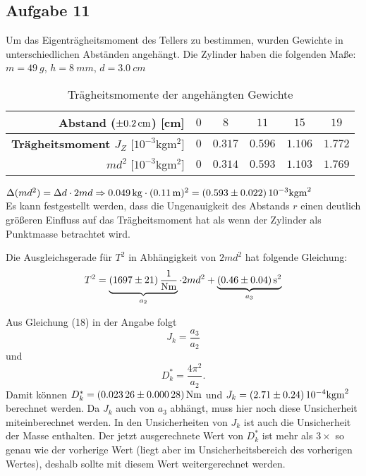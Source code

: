 \documentclass[a4paper,11pt,ngerman]{scrartcl}
\begin{document}
\subsection{Aufgabe 11}
Um das Eigenträgheitsmoment des Tellers zu bestimmen, wurden Gewichte in unterschiedlichen Abständen angehängt.
Die Zylinder haben die folgenden Maße: $m = \SI{49}{g}$, $h = \SI{8}{mm}$, $d = \SI{3.0}{cm}$
\begin{table}[ht]
\begin{center}\label{tab:Gewichte}
\begin{tabular}{r|ccccc}\hline
\textbf{Abstand} ($\SI{\pm 0.2}{cm}$) [cm] & $0$ & $8$ & $11$ & $15$ & $19$ \\
\hline
\textbf{Trägheitsmoment $J_Z$} [$10^{-3}$kgm$^2$] & $0$ & $0.317$ & $0.596$ & $1.106$ & $1.772$ \\
\textbf{$md^2$} [$10^{-3}$kgm$^2$]                & $0$ & $0.314$ & $0.593$ & $1.103$ & $1.769$ \\
\hline\end{tabular}
\caption{Trägheitsmomente der angehängten Gewichte}
\end{center}
\end{table}

$\Delta (md^2) = \Delta d \cdot 2md \Rightarrow \SI{0.049}{kg} \cdot (\SI{0.11}{m})^2 = \SI{0.593 \pm 0.022}{10^{-3} kgm^2}$\\
Es kann festgestellt werden, dass die Ungenauigkeit des Abstands $r$ einen deutlich größeren Einfluss auf das Trägheitsmoment hat als wenn der Zylinder als Punktmasse betrachtet wird.

Die Ausgleichsgerade für $T^2$ in Abhängigkeit von $2md^2$ hat folgende Gleichung:
\begin{equation}
T^2 = \underbrace{\SI{1697 \pm 21}{1 \over Nm}}_{a_2} \cdot 2md^2 + \underbrace{\SI{0.46 \pm 0.04}{s^2}}_{a_3}
\end{equation}

Aus Gleichung (18) in der Angabe folgt
\begin{equation}
J_k = \frac{a_3}{a_2}
\end{equation}
und
\begin{equation}
D^*_k = \frac{4\pi^2}{a_2}.
\end{equation}
Damit können $D^*_k = \SI{0.02326 \pm 0.00028}{Nm}$ und $J_k = \SI{2.71 \pm 0.24}{10^{-4}kgm^2}$ berechnet werden. Da $J_k$ auch von $a_3$ abhängt, muss hier noch diese Unsicherheit miteinberechnet werden. In den Unsicherheiten von $J_k$ ist auch die Unsicherheit der Masse enthalten. Der jetzt ausgerechnete Wert von $D^*_k$ ist mehr als $3\times$ so genau wie der vorherige Wert (liegt aber im Unsicherheitsbereich des vorherigen Wertes), deshalb sollte mit diesem Wert weitergerechnet werden.
\end{document}
